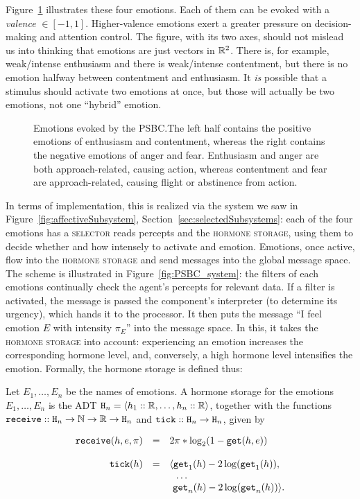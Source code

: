 Figure~\ref{fig:PSBC} illustrates these four emotions. Each of them can be evoked with a {\em valence} $\in [-1,1]$. Higher-valence emotions exert a greater pressure on decision-making and attention control. The figure, with its two axes, should not mislead us into thinking that emotions are just vectors in $\mathbb{R}^2$. There is, for example, weak/intense enthusiasm and there is weak/intense contentment, but there is no emotion halfway between contentment and enthusiasm. It {\em is} possible that a stimulus should activate two emotions at once, but those will actually be two emotions, not one ``hybrid'' emotion.

\begin{figure}
	\centering
	
	\caption{Emotions evoked by the \textsc{PSBC}.The left half contains the positive emotions of enthusiasm and contentment, whereas the right contains the negative emotions of anger and fear. Enthusiasm and anger are both approach-related, causing action, whereas contentment and fear are approach-related, causing flight or abstinence from action.}
	\label{fig:PSBC}
\end{figure}

In terms of implementation, this is realized via the system we saw in Figure~\ref{fig:affectiveSubsystem}, Section~\ref{sec:selectedSubsystems}: each of the four emotions has a \textsc{selector} reads percepts and the \textsc{hormone storage}, using them to decide whether and how intensely to activate and emotion. Emotions, once active, flow into the \textsc{hormone storage} and send messages into the global message space. The scheme is illustrated in Figure~\ref{fig:PSBC_system}: the filters of each emotions continually check the agent's percepts for relevant data. If a filter is activated, the message is passed the component's interpreter (to determine its urgency), which hands it to the processor. It then puts the message ``I feel emotion $E$ with intensity $\pi_E$'' into the message space. In this, it takes the \textsc{hormone storage} into account: experiencing an emotion increases the corresponding hormone level, and, conversely, a high hormone level intensifies the emotion. Formally, the hormone storage is defined thus:

\begin{definition}
	Let $E_1,\dots,E_n$ be the names of emotions. A hormone storage for the emotions $E_1,\dots,E_n$ is the ADT $\mathtt{H}_n = \langle h_1 :: \mathbb{R}, \dots, h_n :: \mathbb{R} \rangle$, together with the functions $\mathtt{receive} :: \mathtt{H}_n \rightarrow \mathbb{N} \rightarrow \mathbb{R} \rightarrow \mathtt{H}_n$ and $\mathtt{tick} :: \mathtt{H}_n \rightarrow \mathtt{H}_n$, given by
	
	$$
		\begin{array}{r c l}
			\mathtt{receive}(h,e,\pi) & = & 2\pi * \log_2(1-\mathtt{get}(h,e))\\
			\\
			\mathtt{tick}(h) & = & \langle \mathtt{get}_1(h) - 2\log(\mathtt{get}_1(h)),\\
							 &   & \ \ \dots\\
							 &   & \ \mathtt{get}_n(h) - 2\log(\mathtt{get}_n(h)) \rangle.
		\end{array}
	$$
\end{definition}

